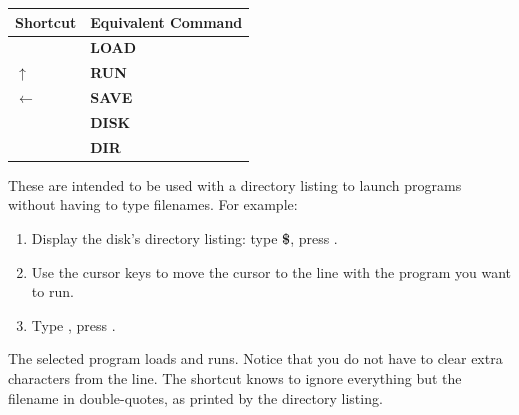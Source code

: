 \begin{center}
\begin{tabular}{|l|l|}
\hline
{\bf Shortcut} & {\bf Equivalent Command} \\
\hline
\screentextwide{/} & {\bf LOAD} \\
\hline
$\uparrow$ & {\bf RUN} \\
\hline
$\leftarrow$ & {\bf SAVE} \\
\hline
\screentextwide{@} & {\bf DISK} \\
\hline
\screentextwide{\$} & {\bf DIR} \\
\hline
\end{tabular}
\end{center}

These are intended to be used with a directory listing to launch programs without having to type filenames. For example:

\begin{enumerate}
\item Display the disk's directory listing: type {\bf \$}, press .
\item Use the cursor keys to move the cursor to the line with the program you want to run.
\item Type {\bf \screentext{$\uparrow$}}, press .
\end{enumerate}

The selected program loads and runs. Notice that you do not have to clear extra characters from the line. The shortcut knows to ignore everything but the filename in double-quotes, as printed by the directory listing.

